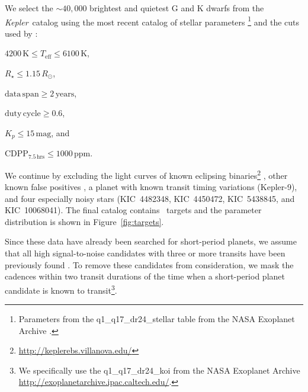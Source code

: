 \documentclass[manuscript, letterpaper]{aastex6}
\newcommand{\project}[1]{\textsl{#1}}
\newcommand{\kepler}{\project{Kepler}}
\newcommand{\dfmfigref}[1]{\ref{fig:#1}}
\newcommand{\dfmFig}[1]{Figure~\dfmfigref{#1}}
\newcommand{\dfmfig}[1]{\dfmFig{#1}}
\newcommand{\unit}[1]{{\ensuremath{\,\mathrm{#1}}}}
\begin{document}
We select the $\sim40,000$ brightest and quietest G and K dwarfs from the
\kepler\ catalog using the most recent catalog of stellar parameters%
\footnote{Parameters from the \textsf{q1\_q17\_dr24\_stellar} table from the
NASA Exoplanet Archive \citep[][with updates]{Huber:2014}.} and the cuts used
by \citet{Burke:2015}:
\begin{itemize}
{\item $4200\unit{K} \le T_\mathrm{eff} \le 6100\unit{K}$,}
{\item $R_\star \le 1.15\,R_\odot$,}
{\item $\mathrm{data\,span} \ge 2\,\mathrm{years}$,}
{\item $\mathrm{duty\,cycle} \ge 0.6$,}
{\item $K_p \le 15\unit{mag}$, and}
{\item $\mathrm{CDPP}_{7.5\unit{hrs}} \le 1000\unit{ppm}$.}
\end{itemize}
We continue by excluding the light curves of known eclipsing
binaries\footnote{\url{http://keplerebs.villanova.edu/}} \citep{Kirk:2016},
other known false positives \citep{Coughlin:2016}, a planet with known transit
timing variations (Kepler-9), and four especially noisy stars (KIC~4482348,
KIC~4450472, KIC~5438845, and KIC~10068041).
The final catalog contains \numtargets\ targets and the parameter distribution
is shown in \dfmfig{targets}.

Since these data have already been searched for short-period planets, we
assume that all high signal-to-noise candidates with three or more transits
have been previously found \citep{Coughlin:2016}.
To remove these candidates from consideration, we mask the cadences within two
transit durations of the time when a short-period planet candidate is known to
transit\footnote{We specifically use the \textsf{q1\_q17\_dr24\_koi} from the
NASA Exoplanet Archive \url{http://exoplanetarchive.ipac.caltech.edu/}.}.
\end{document}
